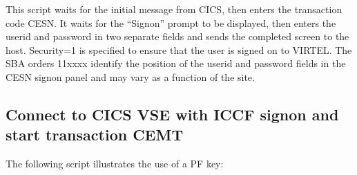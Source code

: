 \documentclass[letterpaper,10pt,english]{sphinxmanual}
\begin{document}
\sphinxAtStartPar
{}

\sphinxAtStartPar
This script waits for the initial message from CICS, then enters the transaction code CESN. It waits for the “Signon” prompt to be displayed, then enters the userid and password in two separate fields and sends the completed screen to the host. Security=1 is specified to ensure that the user is signed on to VIRTEL. The SBA orders 11xxxx identify the position of the userid and password fields in the CESN signon panel and may vary as a function of the site.

\ignorespaces 

\subsection{Connect to CICS VSE with ICCF sign\sphinxhyphen{}on and start transaction CEMT}
\label{\detokenize{connectivity_guide:connect-to-cics-vse-with-iccf-sign-on-and-start-transaction-cemt}}\label{\detokenize{connectivity_guide:index-125}}
\sphinxAtStartPar
The following script illustrates the use of a PF key:
\end{document}
